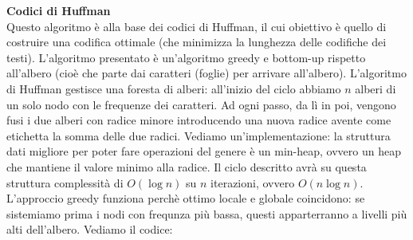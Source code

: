 \documentclass[a4paper,12pt]{article}
\begin{document}
\textbf{Codici di Huffman} \\
Questo algoritmo è alla base dei codici di Huffman, il cui obiettivo è quello di costruire una codifica ottimale (che minimizza la lunghezza delle codifiche dei testi).
L'algoritmo presentato è un'algoritmo greedy e bottom-up rispetto all'albero (cioè che parte dai caratteri (foglie) per arrivare all'albero).
L'algoritmo di Huffman gestisce una foresta di alberi: all'inizio del ciclo abbiamo $n$ alberi di un solo nodo con le frequenze dei caratteri.
Ad ogni passo, da lì in poi, vengono fusi i due alberi con radice minore introducendo una nuova radice avente come etichetta la somma delle due radici. Vediamo un'implementazione:
la struttura dati migliore per poter fare operazioni del genere è un min-heap, ovvero un heap che mantiene il valore minimo alla radice.
Il ciclo descritto avrà su questa struttura complessità di $O(\log{n})$ su $n$ iterazioni, ovvero $O(n\log{n})$.
L'approccio greedy funziona perchè ottimo locale e globale coincidono: se sistemiamo prima i nodi con frequnza più bassa, questi apparterranno
a livelli più alti dell'albero. Vediamo il codice:
\todo%
\begin{lstlisting}[language=C++]
\end{lstlisting}
\end{document}
